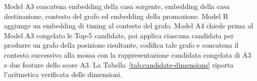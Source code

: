Model A3 concatena embedding della casa sorgente, embedding della casa destinazione, contesto del grafo ed embedding della promozione.  Model B aggiunge un embedding di timing al contesto del grafo.  Model A4 chiede prima al Model A3 congelato le Top-5 candidate, poi applica ciascuna candidata per produrre un grafo della posizione risultante, codifica tale grafo e concatena il contesto successivo alla mossa con la rappresentazione candidata congelata di A3 e due feature dello score A3.  La Tabella~\ref{tab:candidate-dimensions} riporta l'aritmetica verificata delle dimensioni.



